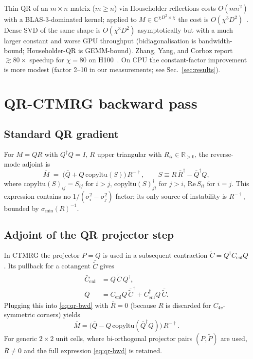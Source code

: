 \documentclass[aps,prb,reprint,amsmath,amssymb,superscriptaddress,floatfix]{revtex4-2}
\newcommand{\copyltu}{\mathrm{copyltu}}
\begin{document}
Thin QR of an $m\times n$ matrix ($m\ge n$) via Householder reflections
costs $O(mn^2)$ with a BLAS-3-dominated kernel; applied to
$M\in\mathbb{C}^{\chi D^2\times \chi}$ the cost is
$O(\chi^3 D^2)$~\cite{Zhang2025qr}. Dense SVD of the same shape is
$O(\chi^3 D^2)$ asymptotically but with a much larger constant and worse
GPU throughput (bidiagonalisation is bandwidth-bound; Householder-QR is
GEMM-bound). Zhang, Yang, and Corboz report
$\gtrsim 80\times$ speedup for $\chi=80$ on H100~\cite{Zhang2025qr}. On
CPU the constant-factor improvement is more modest (factor 2--10 in our
measurements; see Sec.~\ref{sec:results}).

\section{QR-CTMRG backward pass}
\label{sec:backward}

\subsection{Standard QR gradient}

For $M=QR$ with $Q^\dagger Q=I$, $R$ upper triangular with $R_{ii}\in\mathbb{R}_{>0}$,
the reverse-mode adjoint is~\cite{Hubig2019,Townsend2018}
\begin{equation}
\bar M \;=\; \bigl(\bar Q + Q\,\copyltu(S)\bigr)\,R^{-\dagger},
\qquad S \equiv R\,\bar R^\dagger - \bar Q^\dagger Q ,
\label{eq:qr-bwd}
\end{equation}
where $\copyltu(S)_{ij} = S_{ij}$ for $i>j$, $\copyltu(S)_{ji}^\dagger$
for $j>i$, $\mathrm{Re}\,S_{ii}$ for $i=j$. This expression contains no
$1/(\sigma_i^2-\sigma_j^2)$ factor; its only source of instability is
$R^{-\dagger}$, bounded by $\sigma_{\min}(R)^{-1}$.

\subsection{Adjoint of the QR projector step}

In CTMRG the projector $P=Q$ is used in a subsequent contraction
$\tilde C = Q^\dagger C_{\text{enl}} Q$. Its pullback for a cotangent
$\bar{\tilde C}$ gives
\begin{align}
\bar{C}_{\text{enl}} &= Q\,\bar{\tilde C}\,Q^\dagger, \\
\bar Q &= C_{\text{enl}} Q\,\bar{\tilde C}^\dagger + C_{\text{enl}}^\dagger Q\,\bar{\tilde C}.
\end{align}
Plugging this into \eqref{eq:qr-bwd} with $\bar R=0$ (because $R$ is
discarded for $C_{4v}$-symmetric corners) yields
\begin{equation}
\bar M = \bigl(\bar Q - Q\,\copyltu(\bar Q^\dagger Q)\bigr)\,R^{-\dagger}.
\label{eq:qr-proj-bwd}
\end{equation}
For generic $2\times 2$ unit cells, where bi-orthogonal projector
pairs $(P,\tilde P)$ are used, $\bar R \ne 0$ and the full
expression \eqref{eq:qr-bwd} is retained.
\end{document}
